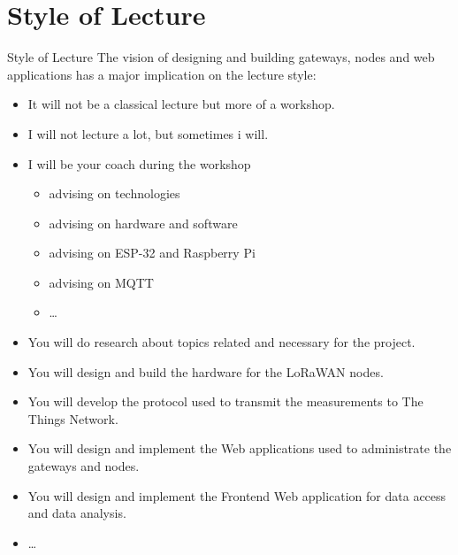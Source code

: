 \nopartpage
\part{Style of Lecture}
\withpartpage

\begin{frame}{Style of Lecture}
The vision of designing and building gateways, nodes and web applications has a major implication on the lecture style:
\begin{itemize}
    \item It will \alert{not be a classical lecture} but more of a \alert{workshop}.
    \item I will \alert{not lecture a lot}, but sometimes i will.
    \item I will be \alert{your coach} during the workshop
    \begin{itemize}
        \item advising on technologies
        \item advising on hardware and software
        \item advising on ESP-32 and Raspberry Pi
        \item advising on MQTT
        \item \ldots
    \end{itemize}
    \item You will do \alert{research about topics} related and necessary \alert{for the project}.
    \item You will \alert{design and build the hardware} for the LoRaWAN nodes.
    \item You will \alert{develop the protocol} used to transmit the measurements to The Things Network.
    \item You will \alert{design and implement the Web applications} used to administrate the gateways and nodes.
    \item You will \alert{design and implement} the Frontend Web application for \alert{data access} and \alert{data analysis}.
    \item \ldots
\end{itemize}
\end{frame}

